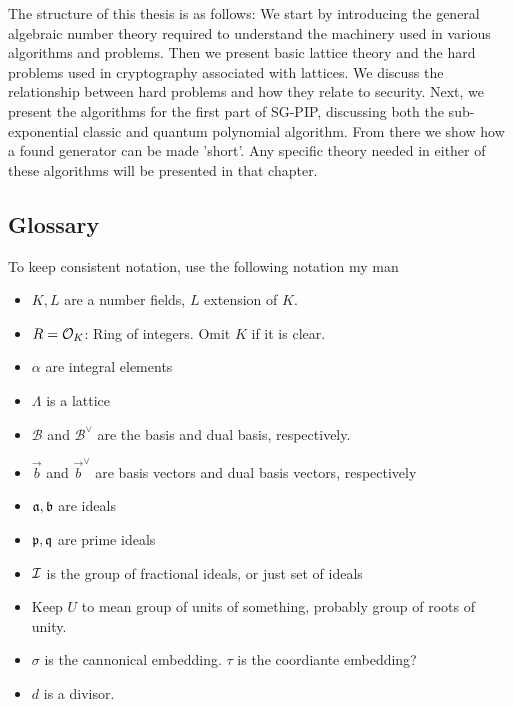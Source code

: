     The structure of this thesis is as follows: We start by introducing the general algebraic number theory required to understand the machinery used in various algorithms and problems. Then we present basic lattice theory and the hard problems used in cryptography associated with lattices. We discuss the relationship between hard problems and how they relate to security. Next, we present the algorithms for the first part of SG-PIP, discussing both the sub-exponential classic and quantum polynomial algorithm. From there we show how a found generator can be made 'short'. Any specific theory needed in either of these algorithms will be presented in that chapter.\newpage
\subsection{Glossary}
    To keep consistent notation, use the following notation my man
    \begin{itemize}
        \item \(K, L\) are a number fields, \(L\) extension of \(K\).
        
        \item \(R = \mathcal{O}_K\): Ring of integers. Omit \(K\) if it is clear.
        
        \item \(\alpha\) are integral elements
        
        \item \(\Lambda\) is a lattice
        
        \item \(\mathcal{B}\) and \(\mathcal{B}^\vee\) are the basis and dual basis, respectively.
        
        \item \(\vec{b}\) and \(\vec{b}^\vee\) are basis vectors and dual basis vectors, respectively
        
        \item \(\mathfrak{a}, \mathfrak{b}\) are ideals
        
        \item \(\mathfrak{p}, \mathfrak{q}\) are prime ideals
        
        \item \(\mathcal{I}\) is the group of fractional ideals, or just set of ideals
        
        \item Keep \(U\) to mean group of units of something, probably group of roots of unity.
        
        \item \(\sigma\) is the cannonical embedding. \(\tau\) is the coordiante embedding?
        
        \item \(d\) is a divisor.
        
    \end{itemize}